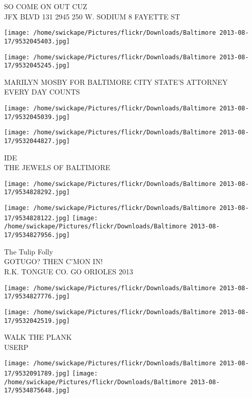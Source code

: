 \documentclass[10pt,letterpaper]{article}
\begin{document}
SO COME ON OUT CUZ\\
JFX BLVD 131 2945 250 W. SODIUM 8 FAYETTE ST
\pagebreak

\texttt{[image: /home/swickape/Pictures/flickr/Downloads/Baltimore 2013-08-17/9532045403.jpg]}

\vspace{0.25in}
\texttt{[image: /home/swickape/Pictures/flickr/Downloads/Baltimore 2013-08-17/9532045245.jpg]}

MARILYN MOSBY FOR BALTIMORE CITY STATE'S ATTORNEY\\
EVERY DAY COUNTS
\pagebreak

\texttt{[image: /home/swickape/Pictures/flickr/Downloads/Baltimore 2013-08-17/9532045039.jpg]}

\vspace{0.25in}
\texttt{[image: /home/swickape/Pictures/flickr/Downloads/Baltimore 2013-08-17/9532044827.jpg]}

IDE\\
THE JEWELS OF BALTIMORE
\pagebreak

\texttt{[image: /home/swickape/Pictures/flickr/Downloads/Baltimore 2013-08-17/9534828292.jpg]}

\vspace{0.25in}
\texttt{[image: /home/swickape/Pictures/flickr/Downloads/Baltimore 2013-08-17/9534828122.jpg]}
\texttt{[image: /home/swickape/Pictures/flickr/Downloads/Baltimore 2013-08-17/9534827956.jpg]}

The Tulip Folly\\
GOTUGO? THEN C'MON IN!\\
R.K. TONGUE CO. GO ORIOLES 2013
\pagebreak

\texttt{[image: /home/swickape/Pictures/flickr/Downloads/Baltimore 2013-08-17/9534827776.jpg]}

\vspace{0.25in}
\texttt{[image: /home/swickape/Pictures/flickr/Downloads/Baltimore 2013-08-17/9532042519.jpg]}

WALK THE PLANK\\
USERP
\pagebreak

\texttt{[image: /home/swickape/Pictures/flickr/Downloads/Baltimore 2013-08-17/9532091789.jpg]}
\texttt{[image: /home/swickape/Pictures/flickr/Downloads/Baltimore 2013-08-17/9534875648.jpg]}
\end{document}
